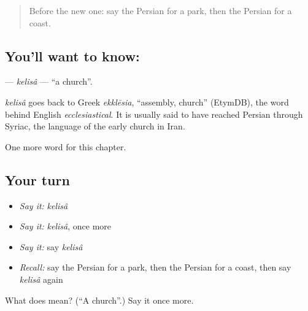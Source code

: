\label{lesson:FA-C87-kelisa}



\begin{quote}
Before the new one: say the Persian for a park, then the Persian for a coast.
\end{quote}

\subsection*{You'll want to know: }
\textbf{} — \emph{kelisâ} — \textquotedblleft{}a church\textquotedblright{}.

\begin{cousinweb}
\emph{kelisâ} goes back to Greek \emph{ekklēsia}, \textquotedblleft{}assembly, church\textquotedblright{} (EtymDB), the word behind English \emph{ecclesiastical}. It is usually said to have reached Persian through Syriac, the language of the early church in Iran.
\end{cousinweb}

\begin{grammarlens}[title={What you've built}]
One more word for this chapter.
\end{grammarlens}

\subsection*{Your turn}
\begin{itemize}
\raggedright
  \item \emph{Say it:} \emph{kelisâ}
  \item \emph{Say it:} \emph{kelisâ}, once more
  \item \emph{Say it:} say \emph{kelisâ}
  \item \emph{Recall:} say the Persian for a park, then the Persian for a coast, then say \emph{kelisâ} again
\end{itemize}

\begin{tcolorbox}[breakable,colback=teal!4,colframe=teal!35!black,title={Before you move on}]
What does  mean? (\textquotedblleft{}A church\textquotedblright{}.) Say it once more.
\end{tcolorbox}
